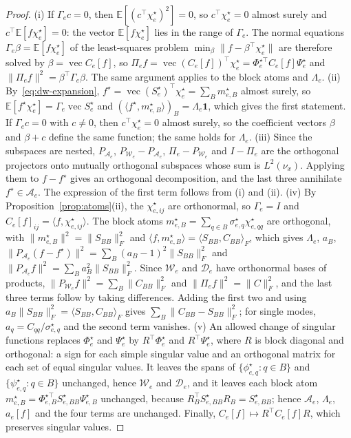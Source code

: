 \documentclass[11pt]{article}
\newcommand{\E}{\mathbb{E}}
\newcommand{\vect}{\operatorname{vec}}
\newcommand{\norm}[1]{\lVert #1\rVert}
\theoremstyle{definition}
\numberwithin{equation}{section}
\begin{document}
\begin{proof}
(i) If $\Gamma_ec=0$, then $\E[(c^\top\chi^\star_e)^2]=0$, so $c^\top\chi^\star_e=0$ almost surely and $c^\top\E[f\chi^\star_e]=0$: the vector $\E[f\chi^\star_e]$ lies in the range of $\Gamma_e$. The normal equations $\Gamma_e\beta=\E[f\chi^\star_e]$ of the least-squares problem $\min_\beta\norm{f-\beta^\top\chi^\star_e}$ are therefore solved by $\beta=\vect C_e[f]$, so $\Pi_ef=\vect(C_e[f])^\top\chi^\star_e=\Phi^{\star\top}_eC_e[f]\Psi^\star_e$ and $\norm{\Pi_ef}^2=\beta^\top\Gamma_e\beta$. The same argument applies to the block atoms and $\Lambda_e$. (ii) By~\eqref{eq:dw-expansion}, $f^\star=\vect(S^\star_e)^\top\chi^\star_e=\sum_Bm^\star_{e,B}$ almost surely, so $\E[f^\star\chi^\star_e]=\Gamma_e\vect S^\star_e$ and $(\langle f^\star,m^\star_{e,B}\rangle)_B=\Lambda_e\mathbf 1$, which gives the first statement. If $\Gamma_ec=0$ with $c\neq0$, then $c^\top\chi^\star_e=0$ almost surely, so the coefficient vectors $\beta$ and $\beta+c$ define the same function; the same holds for $\Lambda_e$. (iii) Since the subspaces are nested, $P_{\mathcal A_e}$, $P_{\mathcal W_e}-P_{\mathcal A_e}$, $\Pi_e-P_{\mathcal W_e}$ and $I-\Pi_e$ are the orthogonal projectors onto mutually orthogonal subspaces whose sum is $L^2(\nu_x)$. Applying them to $f-f^\star$ gives an orthogonal decomposition, and the last three annihilate $f^\star\in\mathcal A_e$. The expression of the first term follows from (i) and (ii). (iv) By Proposition~\ref{prop:atoms}(ii), the $\chi^\star_{e,ij}$ are orthonormal, so $\Gamma_e=I$ and $C_e[f]_{ij}=\langle f,\chi^\star_{e,ij}\rangle$. The block atoms $m^\star_{e,B}=\sum_{q\in B}\sigma^\star_{e,q}\chi^\star_{e,qq}$ are orthogonal, with $\norm{m^\star_{e,B}}^2=\norm{S_{BB}}_F^2$ and $\langle f,m^\star_{e,B}\rangle=\langle S_{BB},C_{BB}\rangle_F$, which gives $\Lambda_e$, $a_B$, $\norm{P_{\mathcal A_e}(f-f^\star)}^2=\sum_B(a_B-1)^2\norm{S_{BB}}_F^2$ and $\norm{P_{\mathcal A_e}f}^2=\sum_Ba_B^2\norm{S_{BB}}_F^2$. Since $\mathcal W_e$ and $\mathcal D_e$ have orthonormal bases of products, $\norm{P_{\mathcal W_e}f}^2=\sum_B\norm{C_{BB}}_F^2$ and $\norm{\Pi_ef}^2=\norm C_F^2$, and the last three terms follow by taking differences. Adding the first two and using $a_B\norm{S_{BB}}_F^2=\langle S_{BB},C_{BB}\rangle_F$ gives $\sum_B\norm{C_{BB}-S_{BB}}_F^2$; for single modes, $a_q=C_{qq}/\sigma^\star_{e,q}$ and the second term vanishes. (v) An allowed change of singular functions replaces $\Phi^\star_e$ and $\Psi^\star_e$ by $R^\top\Phi^\star_e$ and $R^\top\Psi^\star_e$, where $R$ is block diagonal and orthogonal: a sign for each simple singular value and an orthogonal matrix for each set of equal singular values. It leaves the spans of $\{\phi^\star_{e,q}:q\in B\}$ and $\{\psi^\star_{e,q}:q\in B\}$ unchanged, hence $\mathcal W_e$ and $\mathcal D_e$, and it leaves each block atom $m^\star_{e,B}=\Phi^{\star\top}_{e,B}S^\star_{e,BB}\Psi^\star_{e,B}$ unchanged, because $R_B^\top S^\star_{e,BB}R_B=S^\star_{e,BB}$; hence $\mathcal A_e$, $\Lambda_e$, $a_e[f]$ and the four terms are unchanged. Finally, $C_e[f]\mapsto R^\top C_e[f]R$, which preserves singular values.
\end{proof}
\end{document}
